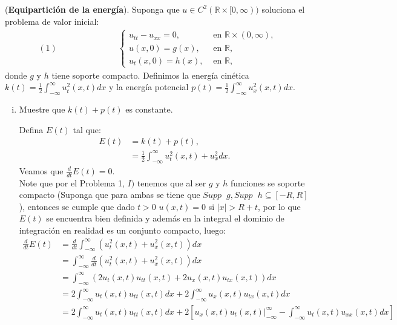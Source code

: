 \begin{homeworkProblem}
  (\textbf{Equipartición de la energía}). Suponga que $u\in C^2(\mathbb{R}\times [0,\infty))$ soluciona el problema de valor inicial:
  \begin{align*}
    (1)\hspace{3cm}\begin{cases}
      u_{tt}-u_{xx}=0, &\text{ en } \mathbb{R}\times (0,\infty) \text{,} \\
      u(x,0)=g(x), &\text{ en }\mathbb{R} \text{,}\\
      u_{t}(x,0)=h(x), &\text{ en }\mathbb{R} \text{,}
    \end{cases}
  \end{align*}
  donde $g$ y $h$ tiene  soporte compacto. Definimos la energía cinética $k(t)=\frac{1}{2}\int_{-\infty}^{\infty}u_t^2(x,t)dx$ y la energía potencial $p(t)=\frac{1}{2}\int_{-\infty}^{\infty}u_x^2(x,t)dx$.
  \begin{enumerate}[i)]
    \item Muestre que $k(t)+p(t)$ es constante.
      \begin{solucion}
        Defina $E(t)$ tal que:
        \begin{align*}
          E(t)&=k(t)+p(t),\\
          &=\frac{1}{2}\int_{-\infty}^{\infty}u_t^2(x,t)+u_x^2dx.
        \end{align*}
        Veamos que $\frac{d}{dt}E(t)=0$.\\
        Note que por el Problema 1, $I)$ tenemos que al ser $g$ y $h$ funciones se soporte compacto (Suponga que para ambas se tiene que $Supp\phantom{x}g,Supp\phantom{x}h\subseteq [-R,R]$), entonces se cumple que dado $t>0$ $u(x,t)=0$ si $|x|>R+t$, por lo que $E(t)$ se encuentra bien definida y además en la integral el dominio de integración en realidad es un conjunto compacto, luego:
        \begin{align*}
          \frac{d}{dt}E(t)&=\frac{d}{dt}\int_{-\infty}^{\infty}(u_t^2(x,t)+u_x^2(x,t))dx\\
          &=\int_{-\infty}^{\infty}\frac{d}{dt}(u_t^2(x,t)+u_x^2(x,t))dx\\
          &=\int_{-\infty}^{\infty}(2u_t(x,t)u_{tt}(x,t)+2u_x(x,t)u_{tx}(x,t))dx\\
          &=2\int_{-\infty}^{\infty}u_t(x,t)u_{tt}(x,t)dx + 2\int_{-\infty}^{\infty}u_x(x,t)u_{tx}(x,t)dx\\
          &=2\int_{-\infty}^{\infty}u_t(x,t)u_{tt}(x,t)dx + 2\left[ u_x(x,t)u_{t}(x,t)\Big|_{-\infty}^{\infty}-\int_{-\infty}^{\infty}u_t(x,t)u_{xx}(x,t)dx\right]\\

\end{align*}
\end{solucion}
\end{enumerate}
\end{homeworkProblem}
